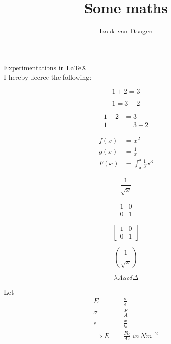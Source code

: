 \documentclass{article}
\title{Some maths}
\author{Izaak van Dongen}
\begin{document}
\maketitle
Experimentations in \LaTeX\\

I hereby decree the following:

\begin{equation*}
  1 + 2 = 3 
\end{equation*}

\begin{equation*}
  1 = 3 - 2
\end{equation*}

\begin{align*}
  1 + 2 &= 3\\
  1 &= 3 - 2
\end{align*}

\begin{align*}
  f(x) &= x^2\\
  g(x) &= \frac{1}{x}\\
  F(x) &= \int^a_b \frac{1}{3}x^3
\end{align*}

\begin{equation*}
\frac{1}{\sqrt{x}}
\end{equation*}

\begin{equation*}
\begin{matrix}
1 & 0\\
0 & 1
\end{matrix}
\end{equation*}

\begin{equation*}
\left[
\begin{matrix}
1 & 0\\
0 & 1
\end{matrix}
\right]
\end{equation*}

\begin{equation*}
\left(\frac{1}{\sqrt{x}}\right)
\end{equation*}

\begin{equation*}
\lambda \Lambda
\alpha
\epsilon
\delta \Delta
\end{equation*}

Let \begin{align*}
    E &= \frac{\sigma}{\epsilon}\\
    \sigma &= \frac{F}{A}\\
    \epsilon &= \frac{x}{l_0}\\
    \Rightarrow E &= \frac{Fl_0}{Ax}\ in\ Nm^{-2}
\end{align*}
\end{document}
